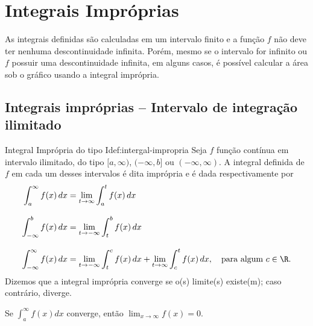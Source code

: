 \section{Integrais Impróprias}
\label{sec:Integrais_Improprias}

As integrais definidas são calculadas em um intervalo finito e a função $f$
não deve ter nenhuma descontinuidade infinita. Porém, mesmo se o intervalo
for infinito ou $f$ possuir uma descontinuidade infinita, em alguns casos,
é possível calcular a área sob o gráfico usando a integral imprópria.

\subsection{Integrais impróprias -- Intervalo de integração ilimitado}

\begin{definicao}{Integral Imprópria do tipo I}{def:intergal-impropria}
  Seja $f$ função contínua em intervalo ilimitado, do tipo
  $[a, \infty)$,
  $(-\infty, b]$ ou
  $(-\infty, \infty)$.
  A integral definida de $f$ em cada
  um desses intervalos é dita imprópria e é dada respectivamente por
  \begin{align*}
    \int_a^{\infty} f(x)                  \, dx
    & = \lim_{t\to\infty} \int_a^t f(x)   \, dx \\[3mm]
        \int_{-\infty}^b f(x)             \, dx
    & = \lim_{t\to-\infty} \int_t^b f(x)  \, dx \\[3mm]
        \int_{-\infty}^{\infty} f(x)      \, dx
    & = \lim_{t\to-\infty} \int_t^c f(x)  \, dx
      + \lim_{t \to \infty} \int_c^t f(x) \, dx,
        \quad \text{para algum } c \in \R.
  \end{align*}
  Dizemos que a integral imprópria converge se o(s) limite(s) existe(m);
  caso contrário, diverge.
\end{definicao}

Se \(\int_a^{\infty} f(x) dx\)
converge, então \(\lim_{x \to \infty} f(x) = 0\).

